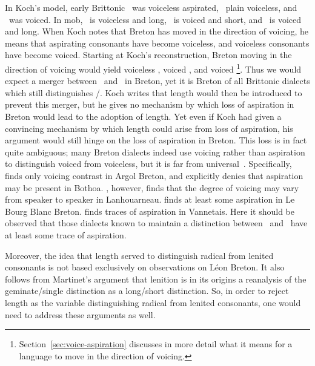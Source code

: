 In Koch's model, early Brittonic \xT\ was voiceless aspirated, \lT\ plain voiceless, and \xD\ was voiced. In \gls{mob}, \xT\ is voiceless and long, \lT\ is voiced and short, and \xD\ is voiced and long. When Koch notes that Breton has moved in the direction of voicing, he means that aspirating consonants have become voiceless, and voiceless consonants have become voiced. Starting at Koch's reconstruction, Breton moving in the direction of voicing would yield voiceless \xT, voiced \lT, and voiced \xD\footnote{Section~\ref{sec:voice-aspiration} discusses in more detail what it means for a language to move in the direction of voicing.}. Thus we would expect a merger between \lT\ and \xD\ in Breton, yet it is Breton  of all Brittonic dialects which still distinguishes \lT/\xD. Koch writes that length would then be introduced to prevent this merger, but he gives no mechanism by which loss of aspiration in Breton would lead to the adoption of length. Yet even if Koch had given a convincing mechanism by which length could arise from loss of aspiration, his argument would still hinge on the loss of aspiration in Breton. This loss is in fact quite ambiguous; many Breton dialects indeed use voicing rather than aspiration to distinguish voiced from voiceless, but it is far from universal~\autocite[221]{Ios_Representation13}. Specifically, \Textcite[114]{Bot_Etude82} finds only voicing contrast in Argol Breton, and \textcite[177--178]{Hum_Phonologie95a} explicitly denies that aspiration may be present in Bothoa.  \Textcite[9]{carlyle_syllabic_1988}, however, finds that the degree of voicing may vary from speaker to speaker in Lanhouarneau. \Textcite[157--167]{falchun_systeme_1951} finds at least some aspiration in  Le Bourg Blanc Breton. \Textcite{Ter_Grammaire70} finds traces of aspiration in Vannetais. Here it should be observed that those dialects known to maintain a distinction between  \lT\ and \xD\ have at least some trace of aspiration.

Moreover, the idea that length served to distinguish radical from lenited consonants is not based exclusively on observations on Léon Breton. It also follows from Martinet's argument that lenition is in its origins a reanalysis of the geminate/single distinction as a long/short distinction. So, in order to reject length as the variable distinguishing radical from lenited consonants, one would need to address these arguments as well. 


